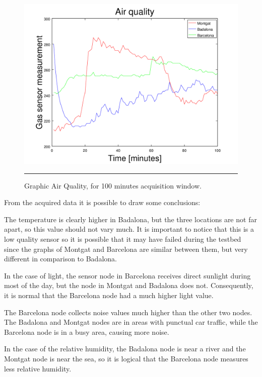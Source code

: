 \documentclass[12pt, a4paper,twoside]{tesi_upf}
\begin{document}
			\begin{figure}[H]
		    \centering
		        \includegraphics[scale=0.4]{./Figures/GraphicGas.png}
		        \rule{18em}{0.5pt}
		        \caption[Graphic Air Quality, for 100 minutes acquisition window]{Graphic Air Quality, for 100 minutes acquisition window.}
		        \label{fig:GraphicGas}
		  \end{figure}
			
			From the acquired data it is possible to draw some conclusions:
      
      The temperature is clearly higher in Badalona, but the three locations are not far apart, so this value should not vary much. It is important to notice that this is a low quality sensor so it is possible that it may have failed during the testbed since the graphs of Montgat and Barcelona are similar between them, but very different in comparison to Badalona.
      
      In the case of light, the sensor node in Barcelona receives direct sunlight during most of the day, but the node in Montgat and Badalona does not. Consequently, it is normal that the Barcelona node had a much higher light value.
      
      The Barcelona node collects noise values much higher than the other two nodes. The Badalona and Montgat nodes are in areas with punctual car traffic, while the Barcelona node is in a busy area, causing more noise.
      
      In the case of the relative humidity, the Badalona node is near a river and the Montgat node is near the sea, so it is logical that the Barcelona node measures less relative humidity.
      
\end{document}
